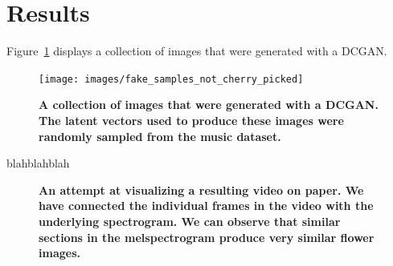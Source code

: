     \section{Results}

        Figure~\ref{fig:dcgan_samples} displays a collection of images that were generated with a DCGAN.

        \begin{figure}[ht]
            \centering
            \texttt{[image: images/fake\_samples\_not\_cherry\_picked]}
            \caption[not used]
            {
                \textbf{A collection of images that were generated with a DCGAN. The latent vectors used to produce these images were randomly sampled from the music dataset.}
            }
            \label{fig:dcgan_samples}
        \end{figure}

        blahblahblah

        \begin{figure}[ht]
            \centering
            \caption[not used]
            {
                \textbf{An attempt at visualizing a resulting video on paper. We have connected the individual frames in the video with the underlying spectrogram. We can observe that similar sections in the melspectrogram produce very similar flower images.}
            }
            \label{fig:video}
        \end{figure}
